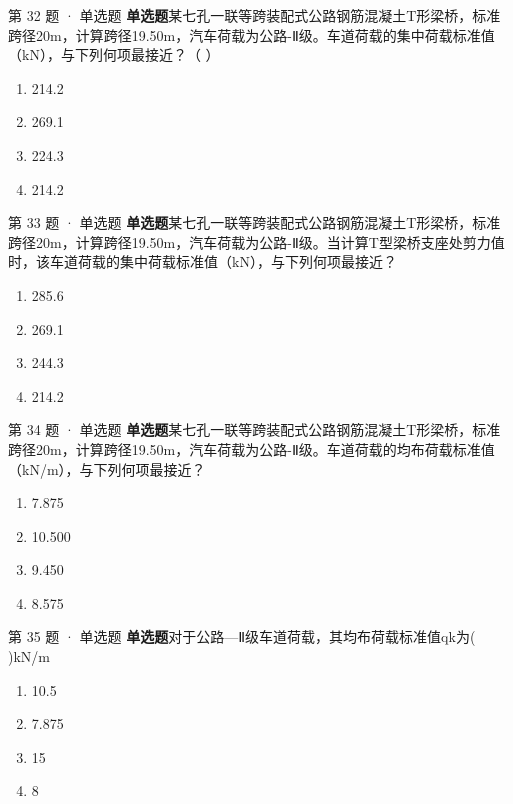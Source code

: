 \documentclass[UTF8,zihao=-4,openany]{ctexbook}
\newenvironment{choices}{\begin{enumerate}[label=\Alph*.,leftmargin=9mm,labelsep=3mm,itemsep=2pt,topsep=4pt]}{\end{enumerate}}
\newcommand{\qtype}[1]{\textcolor{brand}{\sffamily\bfseries #1}}
\begin{document}
\begin{questionbox}{第 32 题 · 单选题}
\qtype{单选题}\quad 某七孔一联等跨装配式公路钢筋混凝土T形梁桥，标准跨径20m，计算跨径19.50m，汽车荷载为公路-Ⅱ级。车道荷载的集中荷载标准值（kN），与下列何项最接近？（ ）
\begin{choices}
\item 214.2
\item 269.1
\item 224.3
\item 214.2
\end{choices}
\end{questionbox}

\begin{questionbox}{第 33 题 · 单选题}
\qtype{单选题}\quad 某七孔一联等跨装配式公路钢筋混凝土T形梁桥，标准跨径20m，计算跨径19.50m，汽车荷载为公路-Ⅱ级。当计算T型梁桥支座处剪力值时，该车道荷载的集中荷载标准值（kN），与下列何项最接近？
\begin{choices}
\item 285.6
\item 269.1
\item 244.3
\item 214.2
\end{choices}
\end{questionbox}

\begin{questionbox}{第 34 题 · 单选题}
\qtype{单选题}\quad 某七孔一联等跨装配式公路钢筋混凝土T形梁桥，标准跨径20m，计算跨径19.50m，汽车荷载为公路-Ⅱ级。车道荷载的均布荷载标准值（kN/m），与下列何项最接近？
\begin{choices}
\item 7.875
\item 10.500
\item 9.450
\item 8.575
\end{choices}
\end{questionbox}

\begin{questionbox}{第 35 题 · 单选题}
\qtype{单选题}\quad 对于公路—Ⅱ级车道荷载，其均布荷载标准值qk为( )kN/m
\begin{choices}
\item 10.5
\item 7.875
\item 15
\item 8
\end{choices}
\end{questionbox}
\end{document}
